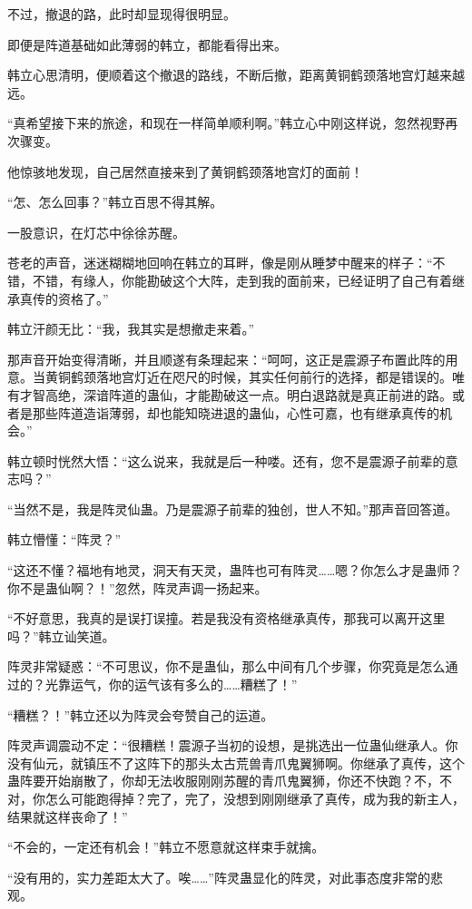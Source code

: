 \begin{this_body}
不过，撤退的路，此时却显现得很明显。

即便是阵道基础如此薄弱的韩立，都能看得出来。

韩立心思清明，便顺着这个撤退的路线，不断后撤，距离黄铜鹤颈落地宫灯越来越远。

“真希望接下来的旅途，和现在一样简单顺利啊。”韩立心中刚这样说，忽然视野再次骤变。

他惊骇地发现，自己居然直接来到了黄铜鹤颈落地宫灯的面前！

“怎、怎么回事？”韩立百思不得其解。

一股意识，在灯芯中徐徐苏醒。

苍老的声音，迷迷糊糊地回响在韩立的耳畔，像是刚从睡梦中醒来的样子：“不错，不错，有缘人，你能勘破这个大阵，走到我的面前来，已经证明了自己有着继承真传的资格了。”

韩立汗颜无比：“我，我其实是想撤走来着。”

那声音开始变得清晰，并且顺遂有条理起来：“呵呵，这正是震源子布置此阵的用意。当黄铜鹤颈落地宫灯近在咫尺的时候，其实任何前行的选择，都是错误的。唯有才智高绝，深谙阵道的蛊仙，才能勘破这一点。明白退路就是真正前进的路。或者是那些阵道造诣薄弱，却也能知晓进退的蛊仙，心性可嘉，也有继承真传的机会。”

韩立顿时恍然大悟：“这么说来，我就是后一种喽。还有，您不是震源子前辈的意志吗？”

“当然不是，我是阵灵仙蛊。乃是震源子前辈的独创，世人不知。”那声音回答道。

韩立懵懂：“阵灵？”

“这还不懂？福地有地灵，洞天有天灵，蛊阵也可有阵灵……嗯？你怎么才是蛊师？你不是蛊仙啊？！”忽然，阵灵声调一扬起来。

“不好意思，我真的是误打误撞。若是我没有资格继承真传，那我可以离开这里吗？”韩立讪笑道。

阵灵非常疑惑：“不可思议，你不是蛊仙，那么中间有几个步骤，你究竟是怎么通过的？光靠运气，你的运气该有多么的……糟糕了！”

“糟糕？！”韩立还以为阵灵会夸赞自己的运道。

阵灵声调震动不定：“很糟糕！震源子当初的设想，是挑选出一位蛊仙继承人。你没有仙元，就镇压不了这阵下的那头太古荒兽青爪鬼翼狮啊。你继承了真传，这个蛊阵要开始崩散了，你却无法收服刚刚苏醒的青爪鬼翼狮，你还不快跑？不，不对，你怎么可能跑得掉？完了，完了，没想到刚刚继承了真传，成为我的新主人，结果就这样丧命了！”

“不会的，一定还有机会！”韩立不愿意就这样束手就擒。

“没有用的，实力差距太大了。唉……”阵灵蛊显化的阵灵，对此事态度非常的悲观。


\end{this_body}
